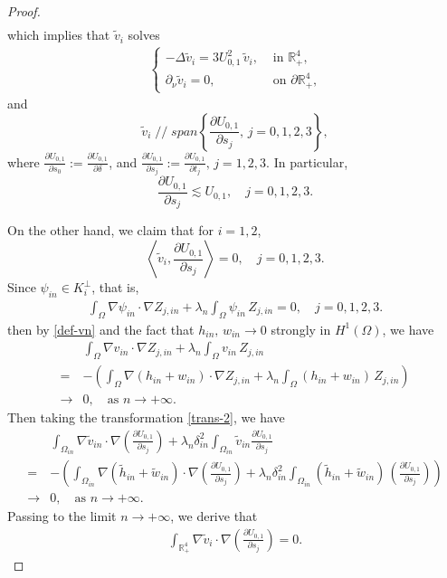 \documentclass[10pt,a4paper]{amsart}
\newcommand{\R}{\mathbb{R}}
\begin{document}
\begin{proof}
\begin{align*}
\end{align*}
which implies  that $\widetilde{v}_i$ solves
\begin{align*}
    \begin{cases}
-\Delta \widetilde{v}_i= 3U_{0,1}^2\,\widetilde{v}_i, &\text{ in $\R^4_+$},\\
\partial_{\nu} \widetilde{v}_i=0,&\text{ on $\partial\R^4_+$,}
\end{cases}
\end{align*}
and { $$\widetilde{v}_i \mathop{//}  span\left\{\frac{\partial U_{0,1}}{\partial s_j},\,j=0,1,2,3\right\},$$}
where $\frac{\partial U_{0,1}}{\partial s_0}:=\frac{\partial U_{0,1}}{\partial \delta}$, and $\frac{\partial U_{0,1}}{\partial s_j}:=\frac{\partial U_{0,1}}{\partial t_j},\,j=1,2,3.$ In particular,
$$\frac{\partial U_{0,1}}{\partial s_j}\lesssim U_{0,1},\quad j=0,1,2,3.$$

\medskip
On the other hand, we claim that for $i=1,2$,
$$\left\langle\widetilde{v}_i,\frac{\partial U_{0,1}}{\partial s_j}\right\rangle=0,\quad j=0,1,2,3.$$
Since $\psi_{in}\in K_i^{\perp}$, that is,
\begin{align*}
    \displaystyle\int_{ \Omega} \nabla \psi_{in} \cdot \nabla Z_{j,in}+\lambda_n\displaystyle\int_{ \Omega}\psi_{in}\,Z_{j,in}=0,\quad j=0,1,2,3.
\end{align*}
then by \eqref{def-vn} and the fact that $h_{in},\,w_{in}\to 0$ strongly in $H^1(\Omega)$, we have
\begin{align*}
    &\displaystyle\int_{ \Omega} \nabla v_{in} \cdot \nabla Z_{j,in}+\lambda_n\displaystyle\int_{ \Omega}v_{in}\,Z_{j,in}\nonumber\\=&-\left(\displaystyle\int_{ \Omega} \nabla \left(h_{in}+w_{in}\right) \cdot \nabla Z_{j,in}+\lambda_n\displaystyle\int_{ \Omega}\left(h_{in}+w_{in}\right) \,Z_{j,in}\right)\nonumber\\
    \longrightarrow&0,\quad\text{as $n\to+\infty$.}
\end{align*}
Then taking the transformation \eqref{trans-2}, we have
\begin{align*}
    &\displaystyle\int_{ \Omega_{in}} \nabla \widetilde{v}_{in} \cdot \nabla \left(\frac{\partial U_{0,1}}{\partial s_j}\right)+\lambda_n\delta_{in}^2\displaystyle\int_{\Omega_{in}}\widetilde{v}_{in}\frac{\partial U_{0,1}}{\partial s_j}\nonumber\\=&-\left(\displaystyle\int_{ \Omega_{in}} \nabla \left(\widetilde{h}_{in}+\widetilde{w}_{in}\right) \cdot\nabla \left(\frac{\partial U_{0,1}}{\partial s_j}\right)+\lambda_n\delta_{in}^2\displaystyle\int_{ \Omega_{in}}\left(\widetilde{h}_{in}+\widetilde{w}_{in}\right) \, \left(\frac{\partial U_{0,1}}{\partial s_j}\right)\right)\nonumber\\
    \longrightarrow&0,\quad\text{as $n\to+\infty$.}
\end{align*}
Passing to the limit $n\to+\infty$, we derive that
\begin{align}
    \label{final} \displaystyle\int_{ \R^4_+} \nabla \widetilde{v}_i \cdot \nabla \left(\frac{\partial U_{0,1}}{\partial s_j}\right)=0.
\end{align}


\end{proof}
\end{document}
